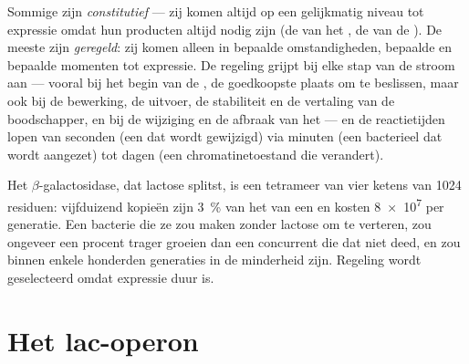 \begin{proposition}\label{prop:b1:expression-control:levels}
Sommige  zijn \emph{constitutief} --- zij komen altijd op een gelijkmatig
niveau tot expressie omdat hun producten altijd nodig zijn (de  van het
, de  van de ). De meeste zijn \emph{geregeld}: zij komen
alleen in bepaalde omstandigheden, bepaalde  en bepaalde momenten tot
expressie. De regeling grijpt bij elke stap van de stroom aan --- vooral bij het
begin van de , de goedkoopste plaats om te beslissen, maar ook bij de
bewerking, de uitvoer, de stabiliteit en de vertaling van de boodschapper, en bij
de wijziging en de afbraak van het  --- en de reactietijden lopen van seconden
(een  dat wordt gewijzigd) via minuten (een bacterieel  dat wordt
aangezet) tot dagen (een chromatinetoestand die verandert).
\end{proposition}

\begin{example}\label{ex:b1:expression-control:economy}
Het  $\beta$-galactosidase, dat lactose splitst, is een tetrameer van vier
ketens van \qty{1024}{} residuen: vijfduizend kopieën zijn \qty{3}{\%} van het 
van een  en kosten \qty{8e7}{}  per generatie. Een bacterie die ze zou maken
zonder lactose om te verteren, zou ongeveer een procent trager groeien dan een
concurrent die dat niet deed, en zou binnen enkele honderden generaties in de
minderheid zijn. Regeling wordt geselecteerd omdat expressie duur is.
\end{example}

\section{Het lac-operon}

